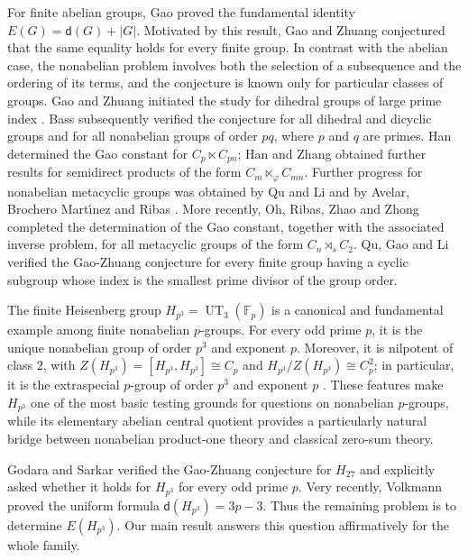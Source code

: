 \documentclass[a4paper, 12pt]{article}
\theoremstyle{definition}
\begin{document}
For finite abelian groups, Gao \cite{Gao1996} proved the fundamental
identity $E(G)=\mathsf d(G)+|G|$. Motivated by this result, Gao and
Zhuang \cite{ZG2005} conjectured that the same equality holds for every
finite group. In contrast with the abelian case, the nonabelian
problem involves both the selection of a subsequence and the ordering
of its terms, and the conjecture is known only for particular classes
of groups. Gao and Zhuang initiated the study for dihedral groups of
large prime index \cite{ZG2005}. Bass \cite{Bass2007} subsequently
verified the conjecture for all dihedral and dicyclic groups and for
all nonabelian groups of order $pq$, where $p$ and $q$ are primes.
Han \cite{Han2015} determined the Gao constant for
$C_p\ltimes C_{pn}$;  Han and Zhang \cite{HanZhang2019} obtained
further results for semidirect products of the form
$C_m\ltimes_{\varphi}C_{mn}$. Further progress for nonabelian
metacyclic groups was obtained by Qu and Li \cite{QuLi2023} and by
Avelar, Brochero Mart\'{\i}nez and Ribas
\cite{AvelarBrocheroRibas2023}. More recently, Oh, Ribas, Zhao and
Zhong \cite{ORZZ} completed the determination of the Gao constant,
together with the associated inverse problem, for all metacyclic
groups of the form $C_n\rtimes_s C_2$. Qu, Gao and Li \cite{QuGaoLi} verified the
Gao-Zhuang conjecture for every finite group having a cyclic
subgroup whose index is the smallest prime divisor of the group
order.

The finite Heisenberg group
$H_{p^3}=\operatorname{UT}_3(\mathbb F_p)$ is a canonical and
fundamental example among finite nonabelian $p$-groups. For every odd
prime $p$, it is the unique nonabelian group of order $p^3$ and
exponent $p$. Moreover, it is nilpotent of class $2$, with
$Z(H_{p^3})=[H_{p^3},H_{p^3}]\cong C_p$ and
$H_{p^3}/Z(H_{p^3})\cong C_p^2$; in particular, it is the extraspecial
$p$-group of order $p^3$ and exponent $p$ \cite{Gorenstein}. These
features make $H_{p^3}$ one of the most basic testing grounds for
questions on nonabelian $p$-groups, while its elementary abelian
central quotient provides a particularly natural bridge between
nonabelian product-one theory and classical zero-sum theory.

Godara and Sarkar \cite{GodaraSarkar}  verified the Gao-Zhuang conjecture
for $H_{27}$ and explicitly asked whether it holds for $H_{p^3}$ for
every odd prime $p$. Very recently, Volkmann \cite{Volkmann} proved
the uniform formula $\mathsf d(H_{p^3})=3p-3$. Thus the remaining
problem is to determine $E(H_{p^3})$. Our main result answers this
question affirmatively for the whole family.
\end{document}
